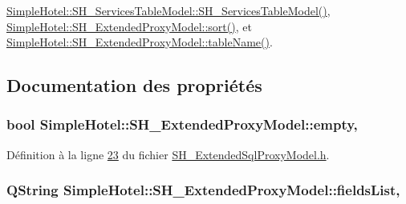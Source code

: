\hyperlink{classSimpleHotel_1_1SH__ServicesTableModel_a109c343989f5fec1ed380c2bcc50c432}{Simple\-Hotel\-::\-S\-H\-\_\-\-Services\-Table\-Model\-::\-S\-H\-\_\-\-Services\-Table\-Model()}, \hyperlink{classSimpleHotel_1_1SH__ExtendedProxyModel_a5d7686a9fae295e0662057b8450c8a8d}{Simple\-Hotel\-::\-S\-H\-\_\-\-Extended\-Proxy\-Model\-::sort()}, et \hyperlink{classSimpleHotel_1_1SH__ExtendedProxyModel_a49617ea8bab745425beec3dbd3fddba7}{Simple\-Hotel\-::\-S\-H\-\_\-\-Extended\-Proxy\-Model\-::table\-Name()}.



\subsection{Documentation des propriétés}
\hypertarget{classSimpleHotel_1_1SH__ExtendedProxyModel_a45f47ab859c5443353977e22417de357}{
\subsubsection[{empty}]{\setlength{\rightskip}{0pt plus 5cm}bool Simple\-Hotel\-::\-S\-H\-\_\-\-Extended\-Proxy\-Model\-::empty\hspace{0.3cm}{\ttfamily [read]}, {\ttfamily [inherited]}}}\label{classSimpleHotel_1_1SH__ExtendedProxyModel_a45f47ab859c5443353977e22417de357}


Définition à la ligne \hyperlink{SH__ExtendedSqlProxyModel_8h_source_l00023}{23} du fichier \hyperlink{SH__ExtendedSqlProxyModel_8h_source}{S\-H\-\_\-\-Extended\-Sql\-Proxy\-Model.\-h}.

\hypertarget{classSimpleHotel_1_1SH__ExtendedProxyModel_a8872cff3d50bf25b1673ed2c951eeb4a}{
\subsubsection[{fields\-List}]{\setlength{\rightskip}{0pt plus 5cm}Q\-String Simple\-Hotel\-::\-S\-H\-\_\-\-Extended\-Proxy\-Model\-::fields\-List\hspace{0.3cm}{\ttfamily [read]}, {\ttfamily [inherited]}}}\label{classSimpleHotel_1_1SH__ExtendedProxyModel_a8872cff3d50bf25b1673ed2c951eeb4a}


